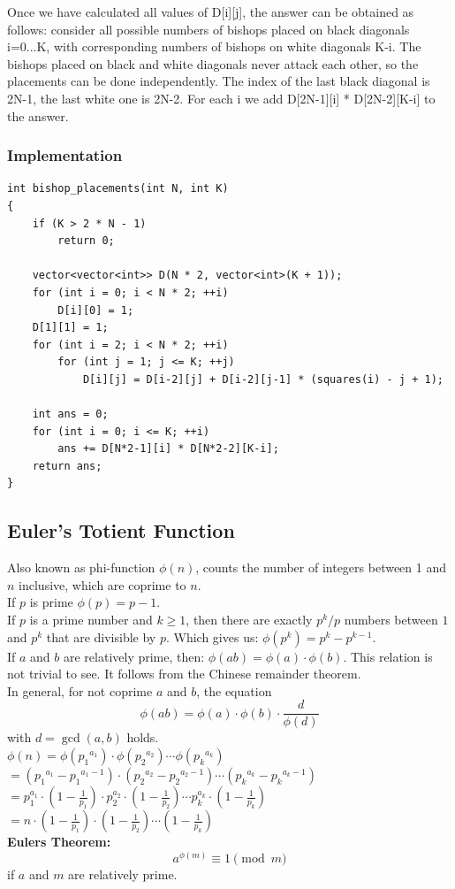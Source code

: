 \documentclass[8pt, a4paper, oneside, twocolumn]{extarticle}
\begin{document}
Once we have calculated all values of D[i][j], the answer can be obtained as follows: consider all possible numbers of bishops placed on black diagonals i=0...K, with corresponding numbers of bishops on white diagonals K-i. The bishops placed on black and white diagonals never attack each other, so the placements can be done independently. The index of the last black diagonal is 2N-1, the last white one is 2N-2. For each i we add D[2N-1][i] * D[2N-2][K-i] to the answer.
\subsubsection{Implementation}
\begin{verbatim}
int bishop_placements(int N, int K)
{
    if (K > 2 * N - 1)
        return 0;

    vector<vector<int>> D(N * 2, vector<int>(K + 1));
    for (int i = 0; i < N * 2; ++i)
        D[i][0] = 1;
    D[1][1] = 1;
    for (int i = 2; i < N * 2; ++i)
        for (int j = 1; j <= K; ++j)
            D[i][j] = D[i-2][j] + D[i-2][j-1] * (squares(i) - j + 1);

    int ans = 0;
    for (int i = 0; i <= K; ++i)
        ans += D[N*2-1][i] * D[N*2-2][K-i];
    return ans;
}
\end{verbatim}
\subsection{Euler's Totient Function}
Also known as phi-function $\phi (n)$, counts the number of integers between 1 and $n$ inclusive, which are coprime to $n$.
\\If $p$ is prime $\phi (p) = p - 1.$
\\If $p$ is a prime number and $k \ge 1$, then there are exactly $p^k / p$ numbers between $1$ and $p^k$ that are divisible by $p$. Which gives us: $\phi(p^k) = p^k - p^{k-1}.$
\\If $a$ and $b$ are relatively prime, then: $\phi(a b) = \phi(a) \cdot \phi(b).$ This relation is not trivial to see. It follows from the Chinese remainder theorem.
\\In general, for not coprime $a$ and $b$, the equation $$\phi(ab) = \phi(a) \cdot \phi(b) \cdot \dfrac{d}{\phi(d)}$$ with $d = \gcd(a, b)$ holds.\\
$ \phi (n) = \phi ({p_1}^{a_1}) \cdot \phi ({p_2}^{a_2}) \cdots \phi ({p_k}^{a_k})$\\
$ = \left({p_1}^{a_1} - {p_1}^{a_1 - 1}\right) \cdot \left({p_2}^{a_2} - {p_2}^{a_2 - 1}\right) \cdots \left({p_k}^{a_k} - {p_k}^{a_k - 1}\right)$\\
$ = p_1^{a_1} \cdot \left(1 - \frac{1}{p_1}\right) \cdot p_2^{a_2} \cdot \left(1 - \frac{1}{p_2}\right) \cdots p_k^{a_k} \cdot \left(1 - \frac{1}{p_k}\right)$ \\ 
$= n \cdot \left(1 - \frac{1}{p_1}\right) \cdot \left(1 - \frac{1}{p_2}\right) \cdots \left(1 - \frac{1}{p_k}\right) $\\
\textbf{Eulers Theorem: }\\
$$a^{\phi(m)} \equiv 1 \pmod m$$ if $a$ and $m$ are relatively prime.
\end{document}

